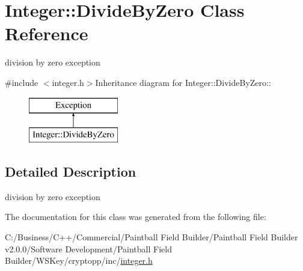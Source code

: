 \hypertarget{class_integer_1_1_divide_by_zero}{
\section{Integer::DivideByZero Class Reference}
\label{class_integer_1_1_divide_by_zero}
}


division by zero exception  


{\ttfamily \#include $<$integer.h$>$}Inheritance diagram for Integer::DivideByZero::\begin{figure}[H]
\begin{center}
\leavevmode
\includegraphics[height=2cm]{class_integer_1_1_divide_by_zero}
\end{center}
\end{figure}


\subsection{Detailed Description}
division by zero exception 

The documentation for this class was generated from the following file:\begin{DoxyCompactItemize}
\item 
C:/Business/C++/Commercial/Paintball Field Builder/Paintball Field Builder v2.0.0/Software Development/Paintball Field Builder/WSKey/cryptopp/inc/\hyperlink{integer_8h}{integer.h}\end{DoxyCompactItemize}

